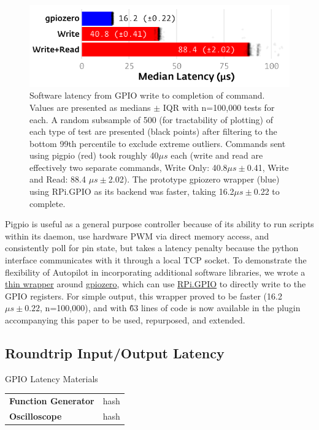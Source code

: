 \begin{figure}[hb!]
\caption{Software latency from GPIO write to completion of command. Values are presented as medians $\pm$ IQR with n=100,000 tests for each. A random subsample of 500 (for tractability of plotting) of each type of test are presented (black points) after filtering to the bottom 99th percentile to exclude extreme outliers.  Commands sent using pigpio (red) took roughly 40$\mu s$ each (write and read are effectively two separate commands, Write Only: 40.8$\mu s \pm$0.41, Write and Read: 88.4 $\mu s \pm$2.02). The prototype gpiozero wrapper (blue) using RPi.GPIO as its backend was faster, taking 16.2$\mu s \pm$0.22 to complete.}
\label{fig:gpiolags}
\includegraphics{figures/gpio_latency_small.pdf}
\end{figure}

Pigpio is useful as a general purpose controller because of its ability to run scripts within its daemon, use hardware PWM via direct memory access, and consistently poll for pin state, but takes a latency penalty because the python interface communicates with it through a local TCP socket. To demonstrate the flexibility of Autopilot in incorporating additional software libraries, we wrote a \href{https://github.com/auto-pi-lot/plugin-tests/blob/main/plugin_tests/hardware/zero.py}{thin wrapper} around \href{https://gpiozero.readthedocs.io/en/stable/}{gpiozero}, which can use \href{https://pypi.org/project/RPi.GPIO/}{RPi.GPIO} to directly write to the GPIO registers. For simple output, this wrapper proved to be faster (16.2 $\mu s \pm 0.22$, n=100,000), and with \~63 lines of code is now available in the plugin accompanying this paper to be used, repurposed, and extended.

\subsection{Roundtrip Input/Output Latency}

\begin{margintable}[0cm]
\caption{GPIO Latency Materials}
\label{tab:gpiomaterials}
\noindent\begin{tabularx}{\linewidth}{lX}%
\toprule
\textbf{Function Generator} & hash \\
\textbf{Oscilloscope} & hash \\
\bottomrule
\end{tabularx}
\end{margintable}


